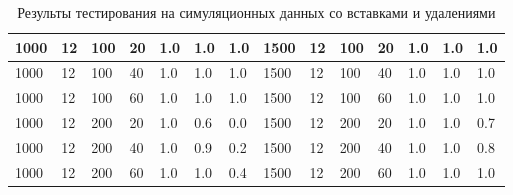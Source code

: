 \begin{table}[H]
\begin{tabular}{|l|l|l|l|l|l|l|l|l|l|l|l|l|l|}
1000                    & 12                     & 100                    & 20                      & 1.0                       & 1.0                    & 1.0                     & 1500                   & 12                     & 100                    & 20                      & 1.0                       & 1.0                    & 1.0                     \\ \hline
1000                    & 12                     & 100                    & 40                      & 1.0                       & 1.0                    & 1.0                     & 1500                   & 12                     & 100                    & 40                      & 1.0                       & 1.0                    & 1.0                     \\ \hline
1000                    & 12                     & 100                    & 60                      & 1.0                       & 1.0                    & 1.0                     & 1500                   & 12                     & 100                    & 60                      & 1.0                       & 1.0                    & 1.0                     \\ \hline
1000                    & 12                     & 200                    & 20                      & 1.0                       & 0.6                    & 0.0                     & 1500                   & 12                     & 200                    & 20                      & 1.0                       & 1.0                    & 0.7                     \\ \hline
1000                    & 12                     & 200                    & 40                      & 1.0                       & 0.9                    & 0.2                     & 1500                   & 12                     & 200                    & 40                      & 1.0                       & 1.0                    & 0.8                     \\ \hline
1000                    & 12                     & 200                    & 60                      & 1.0                       & 1.0                    & 0.4                     & 1500                   & 12                     & 200                    & 60                      & 1.0                       & 1.0                    & 1.0                     \\ \hline
\end{tabular}
\caption{Результы тестирования на симуляционных данных со вставками и удалениями}
\label{table:with_indel_results}
\end{table}
